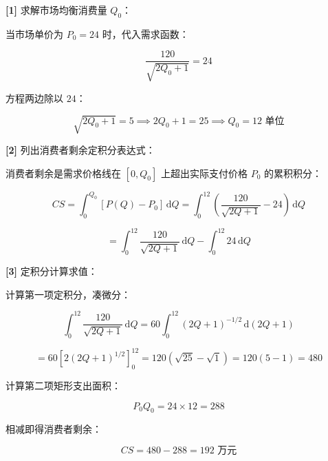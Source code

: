 \documentclass[11pt,a4paper,UTF8]{ctexart}
\begin{document}
\begin{solbox}[分步推导与答题规范]
\textbf{[1]} 求解市场均衡消费量 $Q_0$：

当市场单价为 $P_0 = 24$ 时，代入需求函数：


\begin{equation*}
\frac{120}{\sqrt{2Q_0 + 1}} = 24
\end{equation*}


方程两边除以 $24$：


\begin{equation*}
\sqrt{2Q_0 + 1} = 5 \implies 2Q_0 + 1 = 25 \implies Q_0 = 12\text{ 单位}
\end{equation*}


\textbf{[2]} 列出消费者剩余定积分表达式：

消费者剩余是需求价格线在 $[0, Q_0]$ 上超出实际支付价格 $P_0$ 的累积积分：


\begin{equation*}
CS = \int_0^{Q_0} [P(Q) - P_0]\,\mathrm{d}Q = \int_0^{12} \left(\frac{120}{\sqrt{2Q + 1}} - 24\right)\,\mathrm{d}Q
\end{equation*}



\begin{equation*}
= \int_0^{12} \frac{120}{\sqrt{2Q + 1}}\,\mathrm{d}Q - \int_0^{12} 24\,\mathrm{d}Q
\end{equation*}


\textbf{[3]} 定积分计算求值：

计算第一项定积分，凑微分：


\begin{equation*}
\int_0^{12} \frac{120}{\sqrt{2Q + 1}}\,\mathrm{d}Q = 60 \int_0^{12} (2Q + 1)^{-1/2}\,\mathrm{d}(2Q + 1)
\end{equation*}



\begin{equation*}
= 60 \left[2(2Q + 1)^{1/2}\right]_0^{12} = 120 (\sqrt{25} - \sqrt{1}) = 120 (5 - 1) = 480
\end{equation*}


计算第二项矩形支出面积：


\begin{equation*}
P_0 Q_0 = 24 \times 12 = 288
\end{equation*}


相减即得消费者剩余：


\begin{equation*}
CS = 480 - 288 = 192\text{ 万元}
\end{equation*}

\end{solbox}
\end{document}
